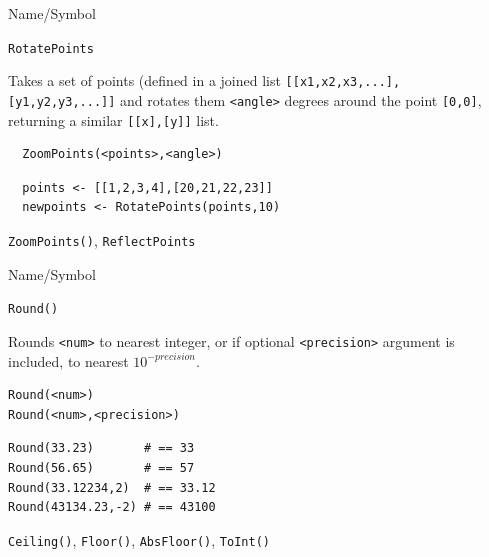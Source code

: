 \begin{desc}{Name/Symbol}
\item[Name/Symbol]	\verb+RotatePoints+

\item[Description]  Takes a set of points (defined in a joined list 
\verb+[[x1,x2,x3,...],+ \verb+[y1,y2,y3,...]]+ and rotates them \verb+<angle>+ degrees
around the point \verb+[0,0]+,  returning a similar \verb+[[x],[y]]+ list.

\item[Usage]
\begin{verbatim}
  ZoomPoints(<points>,<angle>)
\end{verbatim}

\item[Example] 
\begin{verbatim}
  points <- [[1,2,3,4],[20,21,22,23]]
  newpoints <- RotatePoints(points,10)
\end{verbatim}

\item[See Also] \verb+ZoomPoints()+, \verb+ReflectPoints+
\end{desc}


\begin{desc}{Name/Symbol}
\item[Name/Symbol] 	\verb+Round()+

\item[Description] 	Rounds \verb+<num>+ to nearest integer, or if optional \verb+<precision>+ argument is included, to nearest $10^{-precision}$.

\item[Usage]        	
\begin{verbatim}
Round(<num>)
Round(<num>,<precision>)
\end{verbatim}

\item[Example]
\begin{verbatim}
Round(33.23)       # == 33
Round(56.65)       # == 57
Round(33.12234,2)  # == 33.12
Round(43134.23,-2) # == 43100
\end{verbatim}

\item[See Also]     	\verb+Ceiling()+, \verb+Floor()+, \verb+AbsFloor()+, \verb+ToInt()+
\end{desc}

\vfill
\newpage
{}
\vfill


